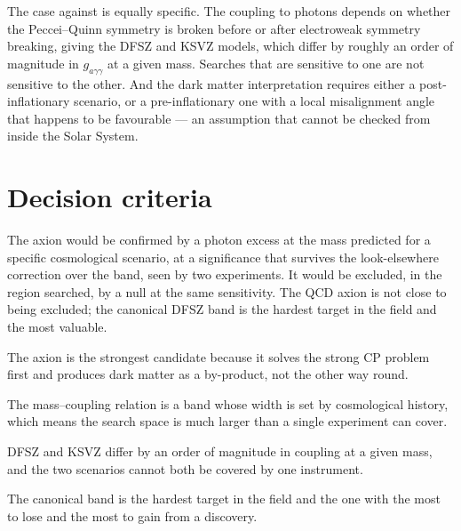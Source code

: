 The case against is equally specific. The coupling to photons depends on
whether the Peccei--Quinn symmetry is broken before or after
electroweak symmetry breaking, giving the DFSZ and KSVZ models, which
differ by roughly an order of magnitude in $g_{a\gamma\gamma}$ at a given
mass. Searches that are sensitive to one are not sensitive to the other.
And the dark matter interpretation requires either a post-inflationary
scenario, or a pre-inflationary one with a local misalignment angle that
happens to be favourable --- an assumption that cannot be checked from
inside the Solar System.

\section{Decision criteria}The axion would be confirmed by a photon excess at the mass
predicted for a specific cosmological scenario, at a significance that
survives the look-elsewhere correction over the band, seen by two
experiments. It would be excluded, in the region searched, by a null at the
same sensitivity. The QCD axion is not close to being excluded; the
canonical DFSZ band is the hardest target in the field and the most
valuable.

\begin{keytakeaways}
\item The axion is the strongest candidate because it solves the strong CP
problem first and produces dark matter as a by-product, not the other way
round.
\item The mass--coupling relation is a band whose width is set by
cosmological history, which means the search space is much larger than a
single experiment can cover.
\item DFSZ and KSVZ differ by an order of magnitude in coupling at a given
mass, and the two scenarios cannot both be covered by one instrument.
\item The canonical band is the hardest target in the field and the one with
the most to lose and the most to gain from a discovery.
\end{keytakeaways}

